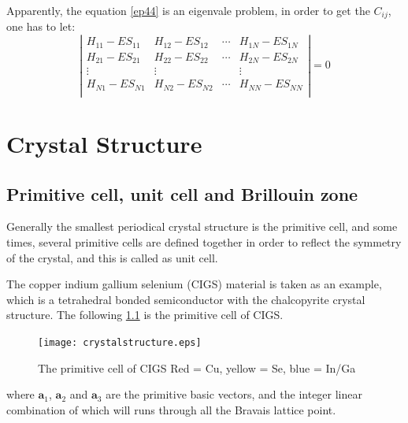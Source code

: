 \documentclass[a4paper, 12pt, titlepage,oneside,drop]{kthesis}
\begin{document}
\noindent Apparently, the equation \ref{ep44} is an eigenvale problem, in order to get the $C_{ij}$, one has to let:
\begin{equation}\label{ep4}
\left|
\begin{matrix}
    H_{11} - E S_{11} & H_{12} - E S_{12} & \cdots & H_{1N} - E S_{1N} \\
   H_{21} - E S_{21} & H_{22} - E S_{22} & \cdots & H_{2N} - E S_{2N} \\
    \vdots               & \vdots               &        & \vdots               \\
  H_{N1} - E S_{N1} & H_{N2} - E S_{N2} & \cdots & H_{NN} - E S_{NN} \\
\end{matrix} \right|
=0
\end{equation}








\chapter{Crystal Structure}
\label{ch:crystalstructure}



\section{Primitive cell, unit cell and Brillouin zone}
\noindent Generally the smallest periodical crystal structure is the primitive cell, and some times, several primitive cells are defined together
in order to reflect the symmetry of the crystal, and this is called as unit cell.

\noindent The copper indium gallium selenium (CIGS) material is taken as an example, which is a tetrahedral bonded semiconductor with the
 chalcopyrite crystal structure. The following \ref{crystr} is the primitive cell of CIGS.
\begin{figure}[h]\label{crystr}
\begin{center}
\texttt{[image: crystalstructure.eps]}
\caption{The primitive cell of CIGS Red = Cu, yellow = Se, blue = In/Ga }
\end{center}

\end{figure}


\noindent where $\textbf{a}_{1}$, $\textbf{a}_{2}$ and  $\textbf{a}_{3}$ are the primitive basic vectors, and the integer linear combination of which will runs through all the Bravais
 lattice point.
\end{document}
